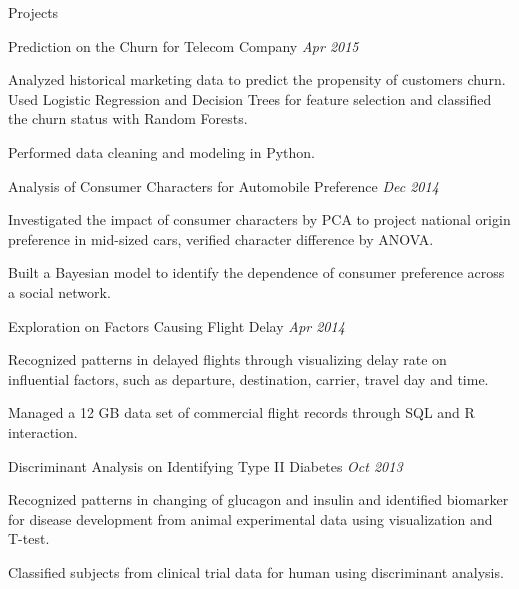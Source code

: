 \documentclass{resume} %
\begin{document}
\begin{rSection}{Projects}

\begin{rSubsection}{Prediction on the Churn for Telecom Company }{\em Apr 2015}{}{}
\item Analyzed historical marketing data to predict the propensity of customers churn. Used Logistic Regression and Decision Trees for feature selection and classified the churn status with Random Forests.
\item Performed data cleaning and modeling in Python.


\end{rSubsection}

\begin{rSubsection}{Analysis of Consumer Characters for Automobile Preference  }{ \em Dec 2014}{}{}
\item Investigated the impact of consumer characters by PCA to project national origin preference in mid-sized cars, verified character difference by ANOVA.
\item Built a Bayesian model to identify the dependence of consumer preference across a social network.
\end{rSubsection}

\begin{rSubsection}{Exploration on Factors Causing Flight Delay }{\em Apr 2014}{}{}
\item Recognized patterns in delayed flights through visualizing delay rate on influential factors, such as departure, destination, carrier, travel day and time.
\item Managed a 12 GB data set of commercial flight records through SQL and R interaction.

\end{rSubsection}

\begin{rSubsection}{Discriminant Analysis on Identifying Type II Diabetes }{\em Oct 2013}{}{}
\item Recognized patterns in changing of glucagon and insulin and identified biomarker for disease development from animal experimental data using visualization and T-test.
\item Classified subjects from clinical trial data for human using discriminant analysis.
\end{rSubsection}

\end{rSection}
\end{document}

